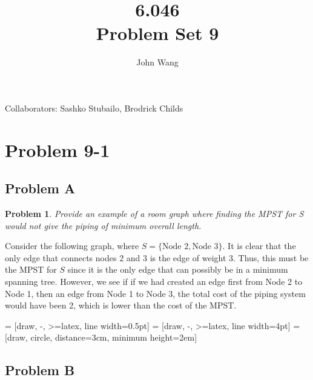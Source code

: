 \documentclass[psamsfonts]{amsart}
\title{6.046 \\
Problem Set 9}
\author{John Wang}
\newtheorem{prob}{Problem}[section]
\newenvironment{sol}{{\bfseries Solution}}{\qedsymbol}
\theoremstyle{definition}
\theoremstyle{remark}
\numberwithin{equation}{section}
\begin{document}
\maketitle

Collaborators: Sashko Stubailo, Brodrick Childs

\section{Problem 9-1}

\subsection{Problem A}

\begin{prob}
Provide an example of a room graph where finding the MPST for S would not give the piping of minimum overall length.
\end{prob}

\begin{sol}
Consider the following graph, where $S = \{\textrm{Node 2}, \textrm{Node 3}\}$. It is clear that the only edge that connects nodes 2 and 3 is the edge of weight 3. Thus, this must be the MPST for $S$ since it is the only edge that can possibly be in a minimum spanning tree. However, we see if if we had created an edge first from Node 2 to Node 1, then an edge from Node 1 to Node 3, the total cost of the piping system would have been 2, which is lower than the cost of the MPST. 

 = [draw, -, >=latex, line width=0.5pt]
 = [draw, -, >=latex, line width=4pt]
 = [draw, circle, distance=3cm, minimum height=2em]

\begin{figure}[h!]
\centering
{}
\end{figure}
\end{sol}

\subsection{Problem B}
\end{document}

